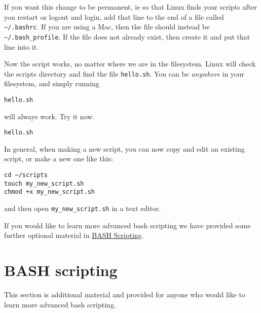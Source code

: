 \documentclass[11pt]{article}
\makeatletter
\newcommand{\boxspacing}{\kern\kvtcb@left@rule\kern\kvtcb@boxsep}
\newcommand{\prompt}[4]{
        {\ttfamily\llap{{\color{blue}\LARGE\faKeyboardO\hspace{3pt}#4}}\vspace{-\baselineskip}}
    }
\makeatother
\begin{document}
    If you want this change to be permanent, ie so that Linux finds your
scripts after you restart or logout and login, add that line to the end
of a file called \texttt{\textasciitilde{}/.bashrc}. If you are using a
Mac, then the file should instead be
\texttt{\textasciitilde{}/.bash\_profile}. If the file does not already
exist, then create it and put that line into it.

    Now the script works, no matter where we are in the filesystem. Linux
will check the scripts directory and find the file \texttt{hello.sh}.
You can be \textit{anywhere} in your filesystem, and simply running

\begin{verbatim}
hello.sh
\end{verbatim}

will always work. Try it now.

    \begin{tcolorbox}[breakable, size=fbox, boxrule=1pt, pad at break*=1mm,colback=cellbackground, colframe=cellborder]
\prompt{In}{incolor}{ }{\boxspacing}
\begin{Verbatim}[commandchars=\\\{\}]
hello.sh
\end{Verbatim}
\end{tcolorbox}

    In general, when making a new script, you can now copy and edit an
existing script, or make a new one like this:

\begin{verbatim}
cd ~/scripts
touch my_new_script.sh
chmod +x my_new_script.sh
\end{verbatim}

and then open \texttt{my\_new\_script.sh} in a text editor.

    If you would like to learn more advanced bash scripting we have provided
some further optional material in \href{bash.ipynb}{BASH Scripting}.





\newpage





    \hypertarget{bash-scripting}{%
\section{BASH scripting}\label{bash-scripting}}

This section is additional material and provided for anyone who would
like to learn more advanced bash scripting.
\end{document}
